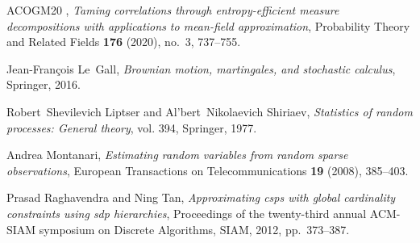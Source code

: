 \documentclass[11pt]{article}
\numberwithin{equation}{section}
\theoremstyle{myremark}
\theoremstyle{myremark}
\theoremstyle{myexample}
\newcommand{\1}{\mathbf{1}}
\begin{document}
\begin{thebibliography}{ACOGM20}
\bysame, \emph{Taming correlations through entropy-efficient measure
  decompositions with applications to mean-field approximation}, Probability
  Theory and Related Fields \textbf{176} (2020), no.~3, 737--755.

Jean-Fran{\c{c}}ois Le~Gall, \emph{Brownian motion, martingales, and stochastic
 calculus}, Springer, 2016.

Robert~Shevilevich Liptser and Al'bert~Nikolaevich Shiriaev, \emph{Statistics
  of random processes: General theory}, vol. 394, Springer, 1977.
  
Andrea Montanari, \emph{{Estimating random variables from random sparse
  observations}}, European Transactions on Telecommunications \textbf{19}
  (2008), 385--403.

Prasad Raghavendra and Ning Tan, \emph{Approximating csps with global
  cardinality constraints using sdp hierarchies}, Proceedings of the
  twenty-third annual ACM-SIAM symposium on Discrete Algorithms, SIAM, 2012,
  pp.~373--387.

\end{thebibliography}
\end{document}
